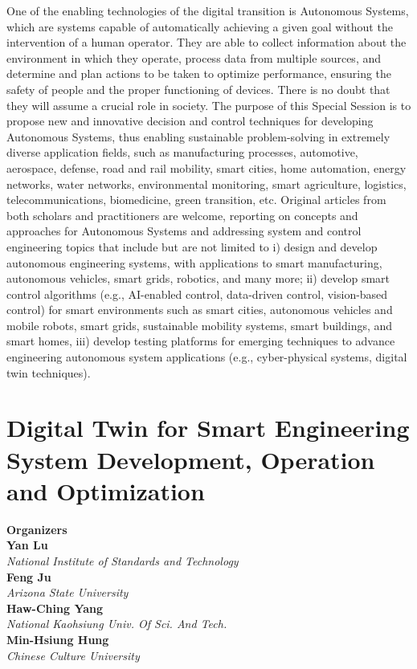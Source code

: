 One of the enabling technologies of the digital transition is Autonomous Systems, which are systems capable of automatically achieving a given goal without the intervention of a human operator. They are able to collect information about the environment in which they operate, process data from multiple sources, and determine and plan actions to be taken to optimize performance, ensuring the safety of people and the proper functioning of devices. There is no doubt that they will assume a crucial role in society. The purpose of this Special Session is to propose new and innovative decision and control techniques for developing Autonomous Systems, thus enabling sustainable problem-solving in extremely diverse application fields, such as manufacturing processes, automotive, aerospace, defense, road and rail mobility, smart cities, home automation, energy networks, water networks, environmental monitoring, smart agriculture, logistics, telecommunications, biomedicine, green transition, etc. Original articles from both scholars and practitioners are welcome, reporting on concepts and approaches for Autonomous Systems and addressing system and control engineering topics that include but are not limited to i) design and develop autonomous engineering systems, with applications to smart manufacturing, autonomous vehicles, smart grids, robotics, and many more; ii) develop smart control algorithms (e.g., AI-enabled control, data-driven control, vision-based control) for smart environments such as smart cities, autonomous vehicles and mobile robots, smart grids, sustainable mobility systems, smart buildings, and smart homes, iii) develop testing platforms for emerging techniques to advance engineering autonomous system applications (e.g., cyber-physical systems, digital twin techniques). 

\section{Digital Twin for Smart Engineering System Development, Operation and Optimization}


\large \textbf{Organizers} \normalsize \vspace{2mm} \\
\textbf{Yan  Lu} \\ 
\textit{National Institute of Standards and Technology} \vspace{{2mm}} \\
\textbf{Feng  Ju} \\ 
\textit{Arizona State University} \vspace{{2mm}} \\
\textbf{Haw-Ching  Yang} \\ 
\textit{National Kaohsiung Univ. Of Sci. And Tech.} \vspace{{2mm}} \\
\textbf{Min-Hsiung  Hung} \\ 
\textit{Chinese Culture University}


